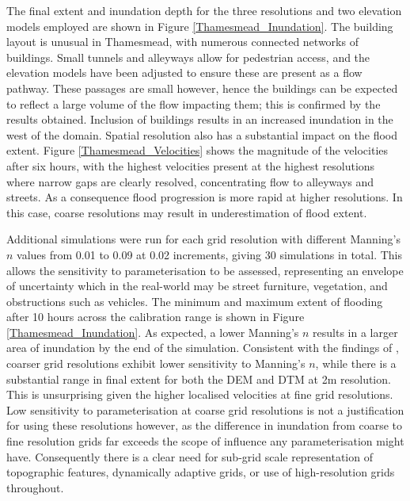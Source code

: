 The final extent and inundation depth for the three resolutions and two elevation models employed are shown in Figure \ref{Thamesmead_Inundation}. The building layout is unusual in Thamesmead, with numerous connected networks of buildings. Small tunnels and alleyways allow for pedestrian access, and the elevation models have been adjusted to ensure these are present as a flow pathway. These passages are small however, hence the buildings can be expected to reflect a large volume of the flow impacting them; this is confirmed by the results obtained. Inclusion of buildings results in an increased inundation in the west of the domain. Spatial resolution also has a substantial impact on the flood extent. Figure \ref{Thamesmead_Velocities} shows the magnitude of the velocities after six hours, with the highest velocities present at the highest resolutions where narrow gaps are clearly resolved, concentrating flow to alleyways and streets. As a consequence flood progression is more rapid at higher resolutions. In this case, coarse resolutions may result in underestimation of flood extent.

Additional simulations were run for each grid resolution with different Manning's $n$ values from 0.01 to 0.09 at 0.02 increments, giving 30 simulations in total. This allows the sensitivity to parameterisation to be assessed, representing an envelope of uncertainty which in the real-world may be street furniture, vegetation, and obstructions such as vehicles. The minimum and maximum extent of flooding after 10 hours across the calibration range is shown in Figure \ref{Thamesmead_Inundation}. As expected, a lower Manning's $n$ results in a larger area of inundation by the end of the simulation. Consistent with the findings of \citet{Yu2006}, coarser grid resolutions exhibit lower sensitivity to Manning's $n$, while there is a substantial range in final extent for both the DEM and DTM at 2m resolution. This is unsurprising given the higher localised velocities at fine grid resolutions. Low sensitivity to parameterisation at coarse grid resolutions is not a justification for using these resolutions however, as the difference in inundation from coarse to fine resolution grids far exceeds the scope of influence any parameterisation might have. Consequently there is a clear need for sub-grid scale representation of topographic features, dynamically adaptive grids, or use of high-resolution grids throughout. 

